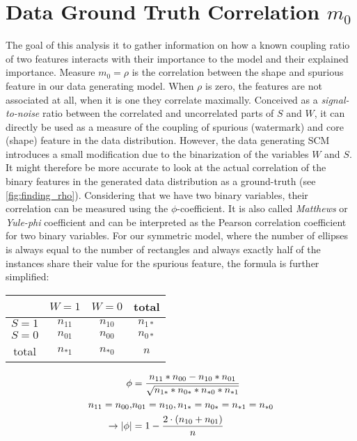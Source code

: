 \section{Data Ground Truth Correlation $m_0$}
The goal of this analysis it to gather information on how a known coupling ratio of two features interacts with their importance to the model and their explained importance. 
Measure $m_0 = \rho$ is the correlation between the shape and spurious feature in our data generating model. When $\rho$ is zero, the features are not associated at all, when it is one they correlate maximally. Conceived as a \textit{signal-to-noise} ratio between the correlated and uncorrelated parts of $S$ and $W$, it can directly be used as a measure of the coupling of spurious (watermark) and core (shape) feature in the data distribution. However, the data generating SCM introduces a small modification due to the binarization of the variables $W$ and $S$. It might therefore be more accurate to look at the actual correlation of the binary features in the generated data distribution as a ground-truth (see \cref{fig:finding_rho}). Considering that we have two binary variables, their correlation can be measured using the $\phi$-coefficient. It is also called \textit{Matthews} or \textit{Yule-phi} coefficient and can be interpreted as the Pearson correlation coefficient for two binary variables. For our symmetric model, where the number of ellipses is always equal to the number of rectangles and always exactly half of the instances share their value for the spurious feature, the formula is further simplified:

\vspace{1em}
\begin{minipage}[t]{0.45\textwidth}
\begin{tabular}{|c|c|c|c|}
    \hline
     & $W= 1$ & $W = 0$ & total  \\  \hline
    $S= 1$ & $n_{11}$ & $n_{10}$ & $n_{1*}$ \\ \hline
    $S= 0$ & $n_{01}$ & $n_{00}$ & $n_{0*}$ \\ \hline
    total& $n_{*1}$ & $n_{*0}$ & $n$ \\ \hline
\end{tabular}
\end{minipage}%
\begin{minipage}[c]{0.53\textwidth}
\begin{align}
\phi & = \frac{n_{11} * n_{00} - n_{10}*n_{01}}{\sqrt{n_{1*}*n_{0*}*n_{*0}*n_{*1}}} \notag \\
n_{11} = n_{00}, &n_{01} = n_{10}, n_{1*} = n_{0*} = n_{*1} = n_{*0}   \notag \\
\rightarrow |\phi| & = 1- \frac{2 \cdot (n_{10} + n_{01} )}{n} \label{eq:simplified_phi}
\end{align}
\end{minipage}
\vspace{1em}

